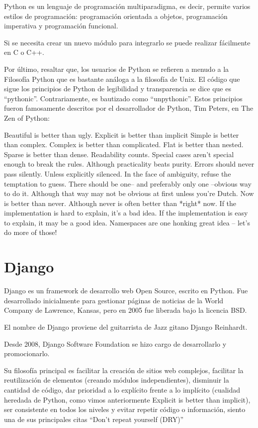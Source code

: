 Python es un lenguaje de programación multiparadigma, es decir, permite varios estilos de programación: programación orientada a objetos, programación imperativa y programación funcional. 


Si se necesita crear un nuevo módulo para integrarlo se puede realizar fácilmente en C o C++.


Por último, resaltar que, los usuarios de Python se refieren a menudo a la Filosofía Python que es bastante análoga a la filosofía de Unix. El código que sigue los principios de Python de legibilidad y transparencia se dice que es “pythonic”. Contrariamente, es bautizado como “unpythonic”. Estos principios fueron famosamente descritos por el desarrollador de Python, Tim Peters, en The Zen of Python:


Beautiful is better than ugly. 
Explicit is better than implicit
Simple is better than complex. 
Complex is better than complicated. 
Flat is better than nested. 
Sparse is better than dense. 
Readability counts. 
Special cases aren’t special enough to break the rules. 
Although practicality beats purity. 
Errors should never pass silently. 
Unless explicitly silenced. 
In the face of ambiguity, refuse the temptation to guess. 
There should be one– and preferably only one –obvious way to do it. 
Although that way may not be obvious at first unless you’re Dutch. 
Now is better than never. Although never is often better than *right* now. 
If the implementation is hard to explain, it’s a bad idea. 
If the implementation is easy to explain, it may be a good idea. 
Namespaces are one honking great idea – let’s do more of those!



\section{Django} 
\label{sec:django}


Django es un framework de desarrollo web Open Source, escrito en Python. Fue desarrollado inicialmente para gestionar páginas de noticias de la World Company de Lawrence, Kansas, pero en 2005 fue liberada bajo la licencia BSD.


El nombre de Django proviene del guitarrista de Jazz gitano Django Reinhardt.


Desde 2008, Django Software Foundation se hizo cargo de desarrollarlo y promocionarlo.


Su filosofía principal es facilitar la creación de sitios web complejos, facilitar la reutilización de elementos (creando módulos independientes), disminuir la cantidad de código, dar prioridad a lo explícito frente a lo implícito (cualidad heredada de Python, como vimos anteriormente Explicit is better than implicit), ser consistente en todos los niveles y evitar repetir código o información, siento una de sus principales citas “Don’t repeat yourself (DRY)”


